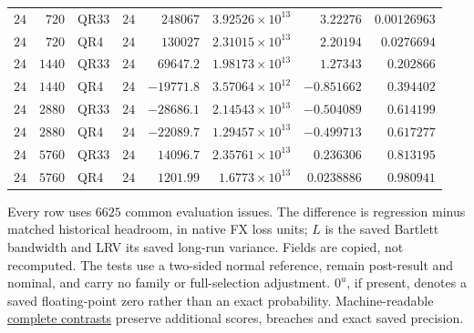 \begin{center}
\begin{tabular}{rrlrrrrr}
$24$ & $720$ & QR33 & $24$ & $248067$ & $3.92526\times10^{13}$ & $3.22276$ & $0.00126963$ \\ %
$24$ & $720$ & QR4 & $24$ & $130027$ & $2.31015\times10^{13}$ & $2.20194$ & $0.0276694$ \\ %
$24$ & $1440$ & QR33 & $24$ & $69647.2$ & $1.98173\times10^{13}$ & $1.27343$ & $0.202866$ \\ %
$24$ & $1440$ & QR4 & $24$ & $-19771.8$ & $3.57064\times10^{12}$ & $-0.851662$ & $0.394402$ \\ %
$24$ & $2880$ & QR33 & $24$ & $-28686.1$ & $2.14543\times10^{13}$ & $-0.504089$ & $0.614199$ \\ %
$24$ & $2880$ & QR4 & $24$ & $-22089.7$ & $1.29457\times10^{13}$ & $-0.499713$ & $0.617277$ \\ %
$24$ & $5760$ & QR33 & $24$ & $14096.7$ & $2.35761\times10^{13}$ & $0.236306$ & $0.813195$ \\ %
$24$ & $5760$ & QR4 & $24$ & $1201.99$ & $1.6773\times10^{13}$ & $0.0238886$ & $0.980941$ \\ %
\bottomrule\end{tabular}\end{center}\endgroup
Every row uses $6625$ common evaluation issues. The difference is regression minus matched historical headroom, in native FX loss units; $L$ is the saved Bartlett bandwidth and LRV its saved long-run variance. Fields are copied, not recomputed. The tests use a two-sided normal reference, remain post-result and nominal, and carry no family or full-selection adjustment. $0^{u}$, if present, denotes a saved floating-point zero rather than an exact probability.
Machine-readable \href{https://github.com/ByronLi0207/financial-mathematics-paper-20261020/blob/revision-v8-goal/results/revision-v9/wp3/contrasts.csv}{complete contrasts} preserve additional scores, breaches and exact saved precision.
